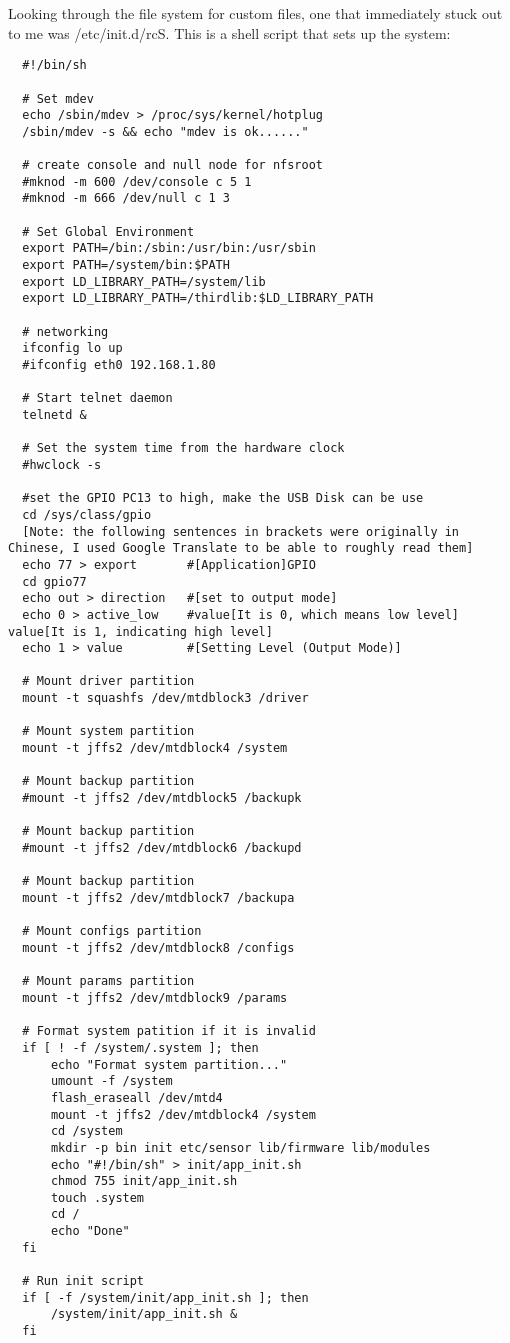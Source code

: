 \documentclass[a4paper, 11pt]{article}
\begin{document}
Looking through the file system for custom files, one that immediately stuck out to me was /etc/init.d/rcS. This is a shell script that sets up the system:
\begin{verbatim}
  #!/bin/sh

  # Set mdev
  echo /sbin/mdev > /proc/sys/kernel/hotplug
  /sbin/mdev -s && echo "mdev is ok......"
  
  # create console and null node for nfsroot
  #mknod -m 600 /dev/console c 5 1
  #mknod -m 666 /dev/null c 1 3
  
  # Set Global Environment
  export PATH=/bin:/sbin:/usr/bin:/usr/sbin
  export PATH=/system/bin:$PATH
  export LD_LIBRARY_PATH=/system/lib
  export LD_LIBRARY_PATH=/thirdlib:$LD_LIBRARY_PATH
  
  # networking
  ifconfig lo up
  #ifconfig eth0 192.168.1.80
  
  # Start telnet daemon
  telnetd &
  
  # Set the system time from the hardware clock
  #hwclock -s
  
  #set the GPIO PC13 to high, make the USB Disk can be use
  cd /sys/class/gpio
  [Note: the following sentences in brackets were originally in Chinese, I used Google Translate to be able to roughly read them]
  echo 77 > export       #[Application]GPIO
  cd gpio77
  echo out > direction   #[set to output mode]
  echo 0 > active_low    #value[It is 0, which means low level] value[It is 1, indicating high level]
  echo 1 > value         #[Setting Level (Output Mode)]
  
  # Mount driver partition
  mount -t squashfs /dev/mtdblock3 /driver
  
  # Mount system partition
  mount -t jffs2 /dev/mtdblock4 /system
  
  # Mount backup partition
  #mount -t jffs2 /dev/mtdblock5 /backupk
  
  # Mount backup partition
  #mount -t jffs2 /dev/mtdblock6 /backupd
  
  # Mount backup partition
  mount -t jffs2 /dev/mtdblock7 /backupa
  
  # Mount configs partition
  mount -t jffs2 /dev/mtdblock8 /configs
  
  # Mount params partition
  mount -t jffs2 /dev/mtdblock9 /params
  
  # Format system patition if it is invalid
  if [ ! -f /system/.system ]; then
      echo "Format system partition..."
      umount -f /system
      flash_eraseall /dev/mtd4
      mount -t jffs2 /dev/mtdblock4 /system
      cd /system
      mkdir -p bin init etc/sensor lib/firmware lib/modules
      echo "#!/bin/sh" > init/app_init.sh
      chmod 755 init/app_init.sh
      touch .system
      cd /
      echo "Done"
  fi
  
  # Run init script
  if [ -f /system/init/app_init.sh ]; then
      /system/init/app_init.sh &
  fi  
\end{verbatim}
\end{document}
